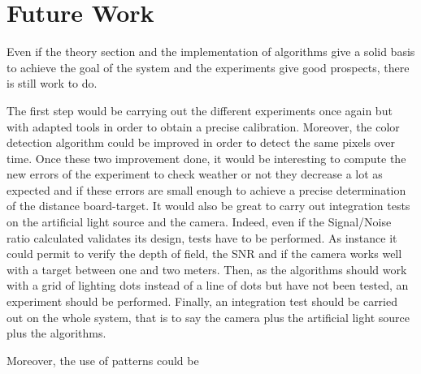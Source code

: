 \section*{Future Work}

Even if the theory section and the implementation of algorithms give a solid basis to achieve the goal of the system and the experiments give good prospects, there is still work to do.

The first step would be carrying out the different experiments once again but with adapted tools in order to obtain a precise calibration. Moreover, the color detection algorithm could be improved in order to detect the same pixels over time. Once these two improvement done, it would be interesting to compute the new errors of the experiment to check weather or not they decrease a lot as expected and if these errors are small enough to achieve a precise determination of the distance board-target. It would also be great to carry out integration tests on the artificial light source and the camera. Indeed, even if the Signal/Noise ratio calculated validates its design, tests have to be performed. As instance it could permit to verify the depth of field, the SNR and if the camera works well with a target between one and two meters. Then, as the algorithms should work with a grid of lighting dots instead of a line of dots but have not been tested, an experiment should be performed. Finally, an integration test should be carried out on the whole system, that is to say the camera plus the artificial light source plus the algorithms.

Moreover, the use of patterns could be 